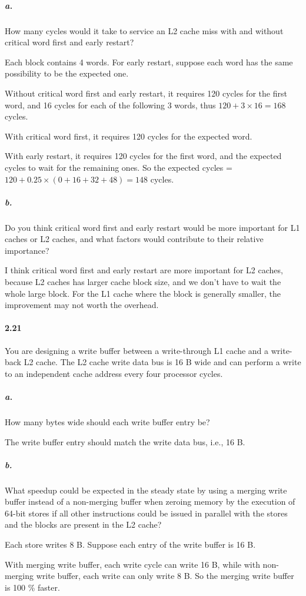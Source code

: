 \documentclass{article}
\begin{document}
\subparagraph{a.} How many cycles would it take to service an L2 cache miss with and without critical word first and early restart?

Each block contains 4 words. For early restart, suppose each word has the same possibility to be the expected one.

Without critical word first and early restart, it requires 120 cycles for the first word, and 16 cycles for each of the following 3 words, thus $120+3\times16=168$ cycles.

With critical word first, it requires 120 cycles for the expected word.

With early restart, it requires 120 cycles for the first word, and the expected cycles to wait for the remaining ones. So the expected cycles = $120 + 0.25\times(0 + 16 + 32 + 48) = 148$ cycles.

\subparagraph{b.} Do you think critical word first and early restart would be more important for L1 caches or L2 caches, and what factors would contribute to their relative importance?

I think critical word first and early restart are more important for L2 caches, because L2 caches has larger cache block size, and we don't have to wait the whole large block. For the L1 cache where the block is generally smaller, the improvement may not worth the overhead.

\paragraph{2.21} You are designing a write buffer between a write-through L1 cache and a write-back L2 cache. The L2 cache write data bus is 16 B wide and can perform a write to an independent cache address every four processor cycles.

\subparagraph{a.} How many bytes wide should each write buffer entry be?

The write buffer entry should match the write data bus, i.e., 16 B.

\subparagraph{b.} What speedup could be expected in the steady state by using a merging write buffer instead of a non-merging buffer when zeroing memory by the execution of 64-bit stores if all other instructions could be issued in parallel with the stores and the blocks are present in the L2 cache?

Each store writes 8 B. Suppose each entry of the write buffer is 16 B.

With merging write buffer, each write cycle can write 16 B, while with non-merging write buffer, each write can only write 8 B. So the merging write buffer is 100 \% faster.
\end{document}
